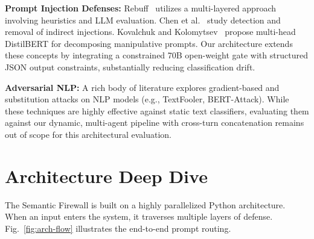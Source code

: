 \documentclass[conference]{IEEEtran}
\begin{document}
\textbf{Prompt Injection Defenses:} Rebuff~\cite{rebuff} utilizes a multi-layered approach involving heuristics and LLM evaluation. Chen et al.~\cite{chen_indirect} study detection and removal of indirect injections. Kovalchuk and Kolomytsev~\cite{kovalchuk_method} propose multi-head DistilBERT for decomposing manipulative prompts. Our architecture extends these concepts by integrating a constrained 70B open-weight gate with structured JSON output constraints, substantially reducing classification drift.


\textbf{Adversarial NLP:} A rich body of literature explores gradient-based and substitution attacks on NLP models (e.g., TextFooler, BERT-Attack). While these techniques are highly effective against static text classifiers, evaluating them against our dynamic, multi-agent pipeline with cross-turn concatenation remains out of scope for this architectural evaluation.

\section{Architecture Deep Dive}

The Semantic Firewall is built on a highly parallelized Python architecture. When an input enters the system, it traverses multiple layers of defense. Fig.~\ref{fig:arch-flow} illustrates the end-to-end prompt routing.
\end{document}
